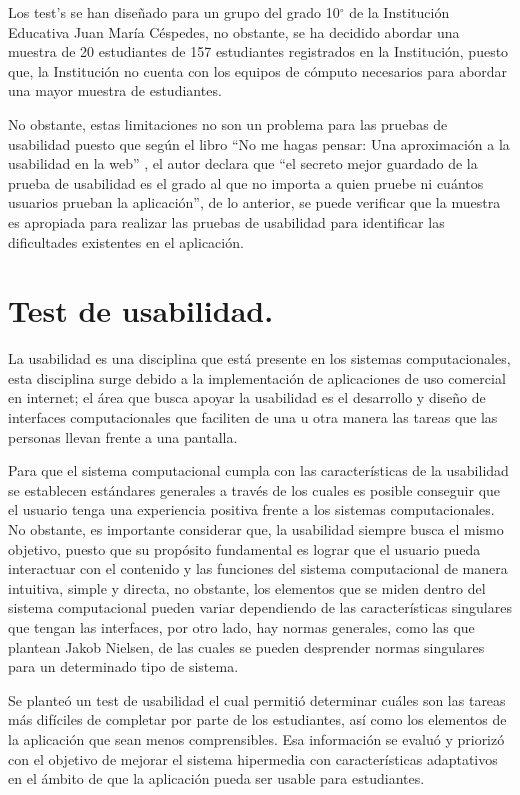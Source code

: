 Los test’s se han diseñado para un grupo del grado 10$^{\circ}$ de la Institución Educativa Juan María Céspedes, no obstante, se ha decidido abordar una muestra de 20 estudiantes de 157 estudiantes registrados en la Institución, puesto que, la Institución no cuenta con los equipos de cómputo necesarios para abordar una mayor muestra de estudiantes.

No obstante, estas limitaciones no son un problema para las pruebas de usabilidad puesto que según el libro ``No me hagas pensar: Una aproximación a la usabilidad en la web'' \cite{NomeHagasPensar}, el autor declara que ``el secreto mejor guardado de la prueba de usabilidad es el grado al que no importa a quien pruebe ni cuántos usuarios prueban la aplicación'', de lo anterior, se puede verificar que la muestra es apropiada para realizar las pruebas de usabilidad para identificar las dificultades existentes en el aplicación.

\section{Test de usabilidad.}

La usabilidad es una disciplina que está presente en los sistemas computacionales, esta disciplina surge debido a la implementación de aplicaciones de uso comercial en internet; el área que busca apoyar la usabilidad es el desarrollo y diseño de interfaces computacionales que faciliten de una u otra manera las tareas que las personas llevan frente a una pantalla.

Para que el sistema computacional cumpla con las características de la usabilidad se establecen estándares generales a través de los cuales es posible conseguir que el usuario tenga una experiencia positiva frente a los sistemas computacionales. No obstante, es importante considerar que, la usabilidad siempre busca el mismo objetivo, puesto que su propósito fundamental es lograr que el usuario pueda interactuar con el contenido y las funciones del sistema computacional de manera intuitiva, simple y directa, no obstante, los elementos que se miden dentro del sistema computacional pueden variar dependiendo de las características singulares que tengan las interfaces, por otro lado, hay normas generales, como las que plantean Jakob  Nielsen\cite{HJakob}, de las cuales se pueden desprender normas singulares para un determinado tipo de sistema.

Se planteó un test de usabilidad el cual permitió determinar cuáles son las tareas más difíciles de completar por parte de los estudiantes, así como los elementos de la aplicación  que sean menos comprensibles. Esa información se evaluó y priorizó con el objetivo de mejorar el sistema hipermedia con características adaptativos en el ámbito de que la aplicación pueda ser usable para estudiantes.

